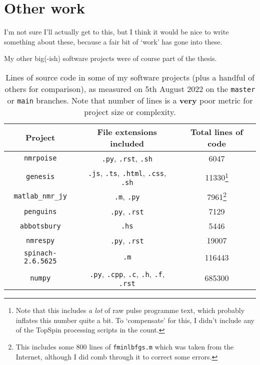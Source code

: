 \chapter{Other work}
\label{chpt:other}

I'm not sure I'll actually get to this, but I think it would be nice to write something about these, because a fair bit of `work' has gone into these.

My other big(-ish)  software projects were of course part of the thesis.

\begin{table}[ht]
    \centering
    \begin{tabular}{ccc}
        \toprule
        \textbf{Project} & \textbf{File extensions included} & \textbf{Total lines of code} \\
        \midrule
        \texttt{nmrpoise} & \texttt{.py}, \texttt{.rst}, \texttt{.sh} & 6047 \\
        \texttt{genesis} & \texttt{.js}, \texttt{.ts}, \texttt{.html}, \texttt{.css}, \texttt{.sh} & 11330\footnote{Note that this includes \textit{a lot} of raw pulse programme text, which probably inflates this number quite a bit. To `compensate' for this, I didn't include any of the TopSpin processing scripts in the count.} \\
        \texttt{matlab\_nmr\_jy} & \texttt{.m}, \texttt{.py} & 7961\footnote{This includes some 800 lines of \texttt{fminlbfgs.m} which was taken from the Internet, although I did comb through it to correct some errors.} \\
        \texttt{penguins} & \texttt{.py}, \texttt{.rst} & 7129 \\
        \texttt{abbotsbury} & \texttt{.hs} & 5446 \\
        \texttt{nmrespy}\autocite{Hulse2022JMR} & \texttt{.py}, \texttt{.rst} & 19007 \\
        \texttt{spinach-2.6.5625}\autocite{Hogben2011JMR} & \texttt{.m} & 116443 \\
        \texttt{numpy}\autocite{Harris2020N} & \texttt{.py}, \texttt{.cpp}, \texttt{.c}, \texttt{.h}, \texttt{.f}, \texttt{.rst} & 685300 \\
        \bottomrule
    \end{tabular}
    \caption[List of software projects]{Lines of source code in some of my software projects (plus a handful of others for comparison), as measured on 5th August 2022 on the \texttt{master} or \texttt{main} branches. Note that number of lines is a \textbf{very} poor metric for project size or complexity.}
\end{table}





\printbibliography[heading=subbibnumbered]{}
